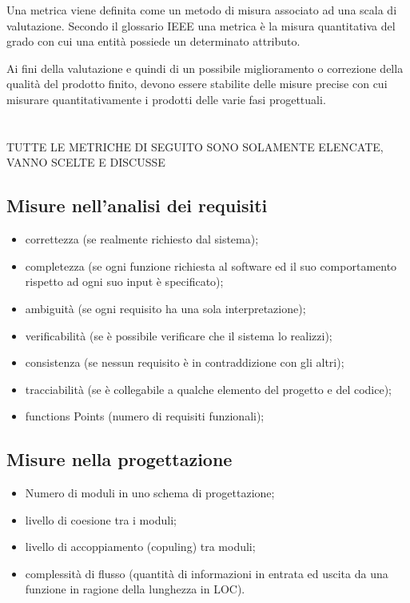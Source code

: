 Una metrica viene definita come un metodo di misura associato ad una scala di
valutazione. Secondo il glossario IEEE una metrica \`e la misura quantitativa del
grado con cui una entit\`a possiede un determinato attributo.

Ai fini della valutazione e quindi di un possibile miglioramento o
correzione della qualit\`a del prodotto finito, devono essere stabilite delle
misure precise con cui misurare quantitativamente i prodotti delle varie fasi
progettuali.\\
\\
\\
TUTTE LE METRICHE DI SEGUITO SONO SOLAMENTE ELENCATE, VANNO SCELTE E DISCUSSE


\subsection{Misure nell'analisi dei requisiti}

\begin{itemize}
  
\item correttezza (se realmente richiesto dal sistema);
\item completezza (se ogni funzione richiesta al software ed il suo
comportamento rispetto ad ogni suo input \`e specificato);
\item ambiguit\`a (se ogni requisito ha una sola interpretazione);
\item verificabilit\`a (se \`e possibile verificare che il sistema lo realizzi);
\item consistenza (se nessun requisito \`e in contraddizione con gli altri);
\item tracciabilit\`a (se \`e collegabile a qualche elemento del progetto e del
codice);
\item functions Points (numero di requisiti funzionali);

\end{itemize}


\subsection{Misure nella progettazione}

\begin{itemize}
  
\item Numero di moduli in uno schema di progettazione;
\item livello di coesione tra i moduli;
\item livello di accoppiamento (copuling) tra moduli;
\item complessit\`a di flusso (quantit\`a di informazioni in entrata ed uscita da
una funzione in ragione della lunghezza in LOC).

\end{itemize}


